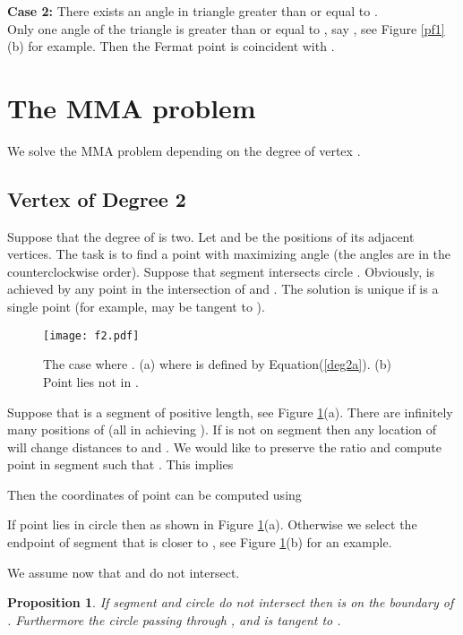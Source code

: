 \documentclass[10pt]{article}
\newtheorem{prop}[theorem]{Proposition}
\begin{document}
{\bf Case 2:}  There exists an angle  in triangle  greater than or equal to .\\
Only one angle of the triangle is greater than or equal to , say , see Figure \ref{pf1}(b) for example.
Then the Fermat point is coincident with .





\section{The MMA problem} \label{s:MAA}

We solve the MMA problem depending on the degree of vertex . 

\subsection{Vertex of Degree 2} \label{sectdeg2}

Suppose that the degree of  is two.  
Let  and  be the positions of its adjacent vertices. 
The task is to find a point  with  maximizing angle  (the angles are in the counterclockwise order).
Suppose that segment  intersects circle  .
Obviously,  is achieved by any point  in the intersection of  and .
The solution is unique if  is a single point (for example,  may be tangent to ). 


\begin{figure}[htp] 
\centering
\texttt{[image: f2.pdf]}
\caption{ The case where . (a)  where  is defined by Equation(\ref{deg2a}). (b) Point  lies not in .}
\label{f2}
\end{figure}

Suppose that  is a segment of positive length, see Figure \ref{f2}(a).
There are infinitely many positions of  (all in  achieving ).
If  is not on segment  then any location of  will change distances to  and .
We would like to preserve the ratio  and compute point  in segment  
such that . This implies



Then the coordinates of point  can be computed using



If point  lies in circle  then  as shown in Figure \ref{f2}(a).
Otherwise we select the endpoint of segment  that is closer to , see Figure \ref{f2}(b) for an example.

 

We assume now that  and  do not intersect.

\begin{prop} \label{propdeg2}
If segment  and circle  do not intersect then  is on the boundary of .
Furthermore the circle passing through , and  is tangent to .
\end{prop}
\end{document}

